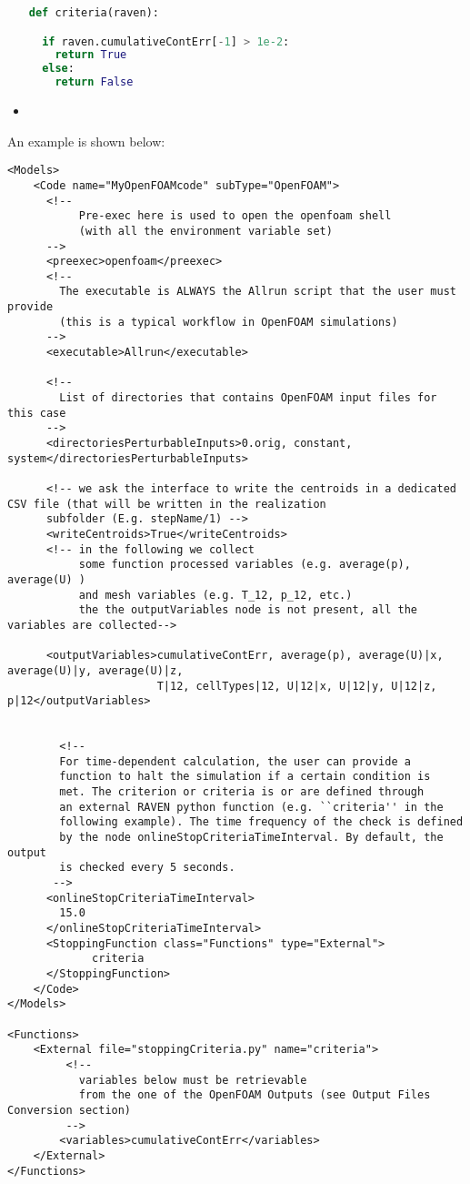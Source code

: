 \begin{itemize}
\begin{lstlisting}[language=python]
def criteria(raven):

  if raven.cumulativeContErr[-1] > 1e-2:
    return True
  else:
    return False
\end{lstlisting}

  \item {}
\end{itemize}

An example is shown  below:

\begin{lstlisting}[style=XML]
<Models>
    <Code name="MyOpenFOAMcode" subType="OpenFOAM">
      <!--
           Pre-exec here is used to open the openfoam shell
           (with all the environment variable set)
      -->
      <preexec>openfoam</preexec>
      <!--
        The executable is ALWAYS the Allrun script that the user must provide
        (this is a typical workflow in OpenFOAM simulations)
      -->
      <executable>Allrun</executable>
      
      <!--
        List of directories that contains OpenFOAM input files for this case
      -->
      <directoriesPerturbableInputs>0.orig, constant, system</directoriesPerturbableInputs>
      
      <!-- we ask the interface to write the centroids in a dedicated CSV file (that will be written in the realization
      subfolder (E.g. stepName/1) -->
      <writeCentroids>True</writeCentroids>
      <!-- in the following we collect 
           some function processed variables (e.g. average(p), average(U) )
           and mesh variables (e.g. T_12, p_12, etc.)
           the the outputVariables node is not present, all the variables are collected-->
      
      <outputVariables>cumulativeContErr, average(p), average(U)|x, average(U)|y, average(U)|z,
                       T|12, cellTypes|12, U|12|x, U|12|y, U|12|z, p|12</outputVariables>
      
      
        <!--
        For time-dependent calculation, the user can provide a
        function to halt the simulation if a certain condition is
        met. The criterion or criteria is or are defined through
        an external RAVEN python function (e.g. ``criteria'' in the
        following example). The time frequency of the check is defined
        by the node onlineStopCriteriaTimeInterval. By default, the output
        is checked every 5 seconds.
       -->
      <onlineStopCriteriaTimeInterval>
        15.0
      </onlineStopCriteriaTimeInterval>
      <StoppingFunction class="Functions" type="External">
             criteria
      </StoppingFunction>
    </Code>
</Models>

<Functions>
    <External file="stoppingCriteria.py" name="criteria">
         <!-- 
           variables below must be retrievable
           from the one of the OpenFOAM Outputs (see Output Files Conversion section)
         -->
        <variables>cumulativeContErr</variables>
    </External>
</Functions>
\end{lstlisting}

